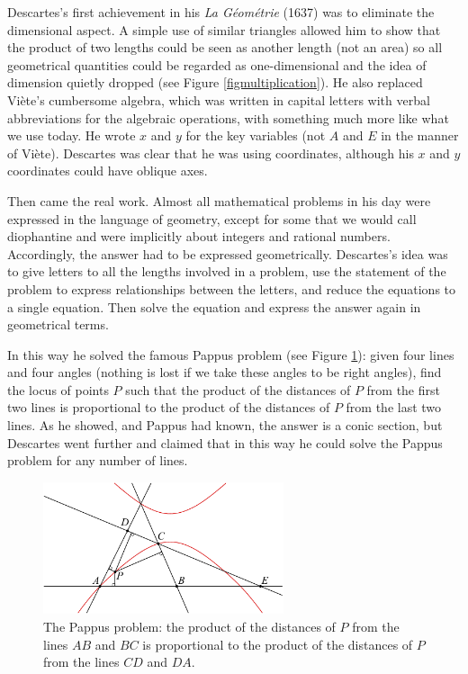 Descartes's first achievement in his \emph{La G\'eom\'etrie} (1637)
was to eliminate the dimensional aspect. A simple use of similar
triangles allowed him to show that the product of two lengths could
be seen as another length (not an area) so all geometrical quantities
could be regarded as one-dimensional and the idea of dimension quietly
dropped (see Figure \ref{figmultiplication}). He also replaced Vi\`ete's
cumbersome algebra, which was written in capital letters with verbal
abbreviations for the algebraic operations, with something much more like
what we use today.  He wrote $x$ and $y$ for the key variables (not $A$
and $E$ in the manner of Vi\`ete). Descartes was clear that he was using
coordinates, although his $x$ and $y$ coordinates could have oblique axes.


Then came the real work. Almost all mathematical problems in his day
were expressed in the language of geometry, except for some that
we would call diophantine and were implicitly about integers and
rational numbers. Accordingly, the answer had to be expressed
geometrically. Descartes's idea was to give letters to all the lengths
involved in a problem, use the statement of the problem to express
relationships between the letters, and reduce the equations to a
single equation. Then solve the equation and express the answer again
in geometrical terms.

 In this way he solved the famous Pappus problem (see Figure
 \ref{figPappusproblem}): given four lines and four angles (nothing is
 lost if we take these angles to be right angles), find the locus of
 points $P$ such that the product of the distances of $P$ from the first
 two lines is proportional to the product of the distances of $P$ from
 the last two lines. As he showed, and Pappus had known, the answer is
 a conic section, but  Descartes went further and claimed that in this
 way he could solve the Pappus problem for any number of lines.

\begin{figure}
\includegraphics[width=200pt]{main/Pappusproblem}
\caption{The Pappus problem: the product of the distances of $P$ from
the lines $AB$ and $BC$ is proportional to the product of the distances
of $P$ from the lines $CD$ and $DA$.}
\label{figPappusproblem}
\end{figure}


